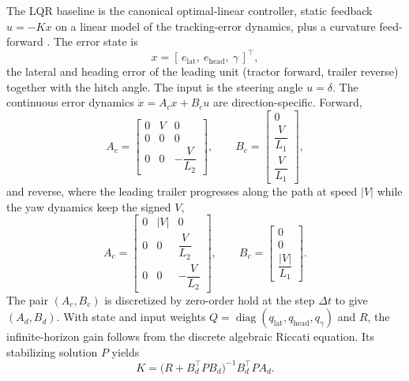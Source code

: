 The LQR baseline is the canonical optimal-linear controller, static feedback $u = -Kx$ on
a linear model of the tracking-error dynamics, plus a curvature feed-forward
\cite{rajamani2011vehicle}. The error state is
\begin{equation}
    x = [\,e_{\mathrm{lat}},\ e_{\mathrm{head}},\ \gamma\,]^\top,
    \label{eq:app_cc_lqr_state}
\end{equation}
the lateral and heading error of the leading unit (tractor forward, trailer reverse)
together with the hitch angle. The input is the steering angle $u = \delta$. The
continuous error dynamics $\dot{x} = A_c x + B_c u$ are direction-specific. Forward,
\begin{equation}
    A_c = \begin{bmatrix}
        0 & V & 0 \\[2.2mm]
        0 & 0 & 0 \\[2.2mm]
        0 & 0 & -\dfrac{V}{L_2}
    \end{bmatrix},
    \qquad
    B_c = \begin{bmatrix}
        0 \\[2.2mm] \dfrac{V}{L_1} \\[2.2mm] \dfrac{V}{L_1}
    \end{bmatrix},
    \label{eq:app_cc_lqr_fwd}
\end{equation}
and reverse, where the leading trailer progresses along the path at speed
$\lvert V \rvert$ while the yaw dynamics keep the signed $V$,
\begin{equation}
    A_c = \begin{bmatrix}
        0 & \lvert V \rvert & 0 \\[2.2mm]
        0 & 0 & \dfrac{V}{L_2} \\[2.2mm]
        0 & 0 & -\dfrac{V}{L_2}
    \end{bmatrix},
    \qquad
    B_c = \begin{bmatrix}
        0 \\[2.2mm] 0 \\[2.2mm] \dfrac{\lvert V \rvert}{L_1}
    \end{bmatrix}.
    \label{eq:app_cc_lqr_rev}
\end{equation}
The pair $(A_c, B_c)$ is discretized by zero-order hold at the step $\Delta t$ to give
$(A_d, B_d)$. With state and input weights $Q = \operatorname{diag}(q_{\mathrm{lat}},
q_{\mathrm{head}}, q_\gamma)$ and $R$, the infinite-horizon gain follows from the discrete
algebraic Riccati equation. Its stabilizing solution $P$ yields
\begin{equation}
    K = \bigl(R + B_d^\top P B_d\bigr)^{-1} B_d^\top P A_d.
    \label{eq:app_cc_lqr_gain}
\end{equation}

